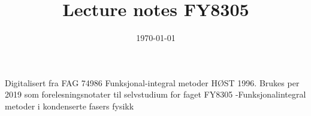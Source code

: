 \documentclass{article}
\title{Lecture notes FY8305}
\date{\today}
\theoremstyle{definition}
\begin{document}
\maketitle
Digitalisert fra FAG 74986 Funksjonal-integral metoder HØST 1996.
Brukes per 2019 som forelesningsnotater til selvstudium for faget FY8305 -Funksjonalintegral metoder i kondenserte fasers fysikk

\tableofcontents




\end{document}

